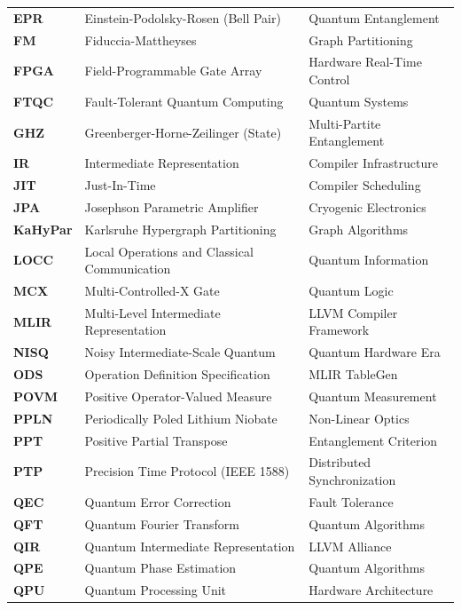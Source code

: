 \begin{tabularx}{\textwidth}{llX}
    \textbf{EPR} & Einstein-Podolsky-Rosen (Bell Pair) & Quantum Entanglement \\
    \textbf{FM} & Fiduccia-Mattheyses & Graph Partitioning \\
    \textbf{FPGA} & Field-Programmable Gate Array & Hardware Real-Time Control \\
    \textbf{FTQC} & Fault-Tolerant Quantum Computing & Quantum Systems \\
    \textbf{GHZ} & Greenberger-Horne-Zeilinger (State) & Multi-Partite Entanglement \\
    \textbf{IR} & Intermediate Representation & Compiler Infrastructure \\
    \textbf{JIT} & Just-In-Time & Compiler Scheduling \\
    \textbf{JPA} & Josephson Parametric Amplifier & Cryogenic Electronics \\
    \textbf{KaHyPar} & Karlsruhe Hypergraph Partitioning & Graph Algorithms \\
    \textbf{LOCC} & Local Operations and Classical Communication & Quantum Information \\
    \textbf{MCX} & Multi-Controlled-X Gate & Quantum Logic \\
    \textbf{MLIR} & Multi-Level Intermediate Representation & LLVM Compiler Framework \\
    \textbf{NISQ} & Noisy Intermediate-Scale Quantum & Quantum Hardware Era \\
    \textbf{ODS} & Operation Definition Specification & MLIR TableGen \\
    \textbf{POVM} & Positive Operator-Valued Measure & Quantum Measurement \\
    \textbf{PPLN} & Periodically Poled Lithium Niobate & Non-Linear Optics \\
    \textbf{PPT} & Positive Partial Transpose & Entanglement Criterion \\
    \textbf{PTP} & Precision Time Protocol (IEEE 1588) & Distributed Synchronization \\
    \textbf{QEC} & Quantum Error Correction & Fault Tolerance \\
    \textbf{QFT} & Quantum Fourier Transform & Quantum Algorithms \\
    \textbf{QIR} & Quantum Intermediate Representation & LLVM Alliance \\
    \textbf{QPE} & Quantum Phase Estimation & Quantum Algorithms \\
    \textbf{QPU} & Quantum Processing Unit & Hardware Architecture \\

\end{tabularx}
